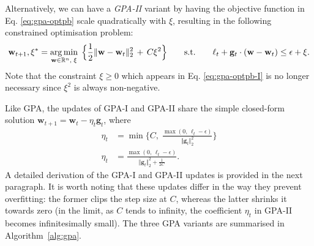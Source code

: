 Alternatively, we can have a \emph{GPA-II} variant by having the objective function in Eq. \eqref{eq:gpa-optpb} scale quadratically with $\xi$, resulting in the following constrained optimisation problem:
\begin{equation}
\label{eq:gpa-optpb-II}
	\mathbf{w}_{t+1}, \xi^*
	= \operatorname*{arg\,min}_{\mathbf{w}\in\mathbb{R}^n, \; \xi} \; \Big\{\frac{1}{2}\Vert\mathbf{w} - \mathbf{w}_t\Vert_2^2 \, + \, C\xi^2\Big\}
	\qquad \text{s.t.} \qquad \ell_t + \mathbf{g}_t\cdot(\mathbf{w} - \mathbf{w}_t) \leq \epsilon + \xi.
\end{equation}
Note that the constraint $\xi \geq 0$ which appears in Eq. \eqref{eq:gpa-optpb-I} is no longer necessary since $\xi^2$ is always non-negative.

Like GPA, the updates of GPA-I and GPA-II share the simple closed-form solution $\mathbf{w}_{t+1} = \mathbf{w}_t - \eta_t\mathbf{g}_t$, where
\begin{align}
\label{eq:gpa-learning-rates}
	\eta_t
	&= \min\bigg\{C, \; \frac{\max(0,\,\ell_t - \epsilon)}{\Vert\mathbf{g}_t\Vert_2^2}\bigg\}
	\nonumber \tag{GPA-I} \\
	\eta_t
	&= \frac{\max(0,\,\ell_t - \epsilon)}{\Vert\mathbf{g}_t\Vert_2^2 + \frac{1}{2C}}
	\tag{GPA-II}.
\end{align}
A detailed derivation of the GPA-I and GPA-II updates is provided in the next paragraph. It is worth noting that these updates differ in the way they prevent overfitting: the former clips the step size at $C$, whereas the latter shrinks it towards zero (in the limit, as $C$ tends to infinity, the coefficient $\eta_t$ in GPA-II becomes infinitesimally small).
The three GPA variants are summarised in Algorithm~\ref{alg:gpa}.
